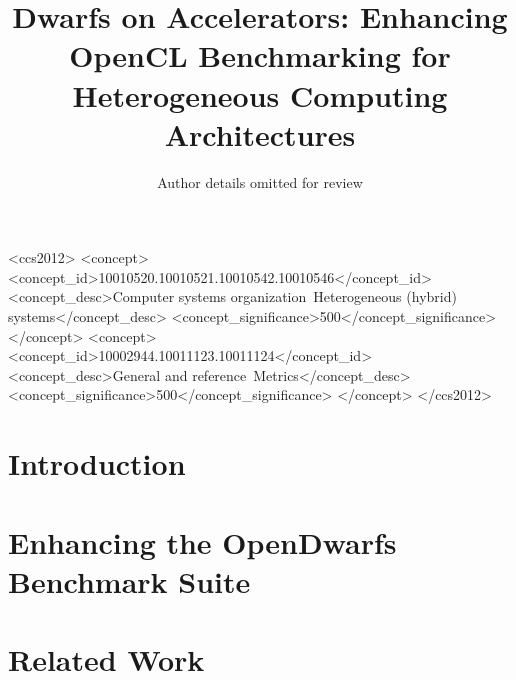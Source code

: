 \documentclass[sigconf,preprint,9pt]{acmart}
\begin{document}
\title[Dwarfs on Accelerators]{Dwarfs on Accelerators: Enhancing OpenCL Benchmarking for Heterogeneous Computing Architectures}

\author{Author details omitted for review}
%

\begin{abstract}
	
\end{abstract}

\begin{CCSXML}
	<ccs2012>
	<concept>
	<concept_id>10010520.10010521.10010542.10010546</concept_id>
	<concept_desc>Computer systems organization~Heterogeneous (hybrid) systems</concept_desc>
	<concept_significance>500</concept_significance>
	</concept>
	<concept>
	<concept_id>10002944.10011123.10011124</concept_id>
	<concept_desc>General and reference~Metrics</concept_desc>
	<concept_significance>500</concept_significance>
	</concept>
	</ccs2012>
\end{CCSXML}

\maketitle

\section{Introduction}
\section{Enhancing the OpenDwarfs Benchmark Suite}

\section{Related Work}
\end{document}

